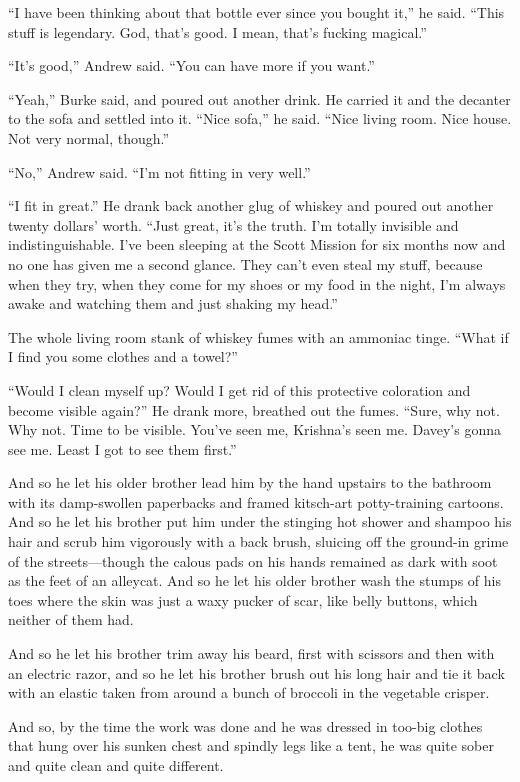 \documentclass{article}
\begin{document}
``I have been thinking about that bottle ever since you bought it,''
he said.  ``This stuff is legendary.  God, that's good.  I mean,
that's fucking magical.''

``It's good,'' Andrew said.  ``You can have more if you want.''

``Yeah,'' Burke said, and poured out another drink.  He carried it and
the decanter to the sofa and settled into it.  ``Nice sofa,'' he said. 
``Nice living room.  Nice house.  Not very normal, though.''

``No,'' Andrew said.  ``I'm not fitting in very well.''

``I fit in great.'' He drank back another glug of whiskey and poured
out another twenty dollars' worth.  ``Just great, it's the truth.  I'm
totally invisible and indistinguishable.  I've been sleeping at the
Scott Mission for six months now and no one has given me a second
glance.  They can't even steal my stuff, because when they try, when
they come for my shoes or my food in the night, I'm always awake and
watching them and just shaking my head.''

The whole living room stank of whiskey fumes with an ammoniac tinge. 
``What if I find you some clothes and a towel?''

``Would I clean myself up?  Would I get rid of this protective
coloration and become visible again?'' He drank more, breathed out the
fumes.  ``Sure, why not.  Why not.  Time to be visible.  You've seen
me, Krishna's seen me.  Davey's gonna see me.  Least I got to see them
first.''

And so he let his older brother lead him by the hand upstairs to the
bathroom with its damp-swollen paperbacks and framed kitsch-art
potty-training cartoons.  And so he let his brother put him under the
stinging hot shower and shampoo his hair and scrub him vigorously with
a back brush, sluicing off the ground-in grime of the streets---though
the calous pads on his hands remained as dark with soot as the feet of
an alleycat.  And so he let his older brother wash the stumps of his
toes where the skin was just a waxy pucker of scar, like belly
buttons, which neither of them had.

And so he let his brother trim away his beard, first with scissors and
then with an electric razor, and so he let his brother brush out his
long hair and tie it back with an elastic taken from around a bunch of
broccoli in the vegetable crisper.

And so, by the time the work was done and he was dressed in too-big
clothes that hung over his sunken chest and spindly legs like a tent,
he was quite sober and quite clean and quite different.
\end{document}
